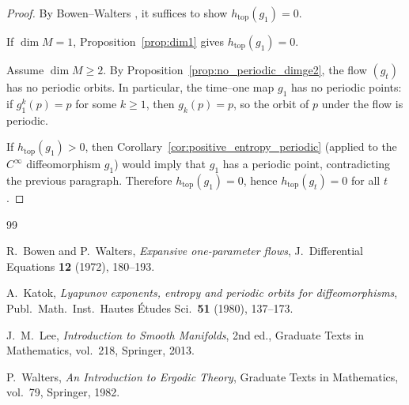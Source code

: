 \documentclass[11pt]{article}
\theoremstyle{definition}
\theoremstyle{remark}
\newcommand{\htop}{h_{\mathrm{top}}}
\begin{document}
\begin{proof}
By Bowen--Walters \cite{BW}, it suffices to show $\htop(g_1)=0$.

If $\dim M=1$, Proposition~\ref{prop:dim1} gives $\htop(g_1)=0$.

Assume $\dim M\ge 2$.
By Proposition~\ref{prop:no_periodic_dimge2}, the flow $(g_t)$ has no periodic orbits.
In particular, the time--one map $g_1$ has no periodic points: if $g_1^k(p)=p$ for some $k\ge 1$, then $g_k(p)=p$, so the orbit of $p$ under the flow is periodic.

If $\htop(g_1)>0$, then Corollary~\ref{cor:positive_entropy_periodic} (applied to the $C^\infty$ diffeomorphism $g_1$)
would imply that $g_1$ has a periodic point, contradicting the previous paragraph.
Therefore $\htop(g_1)=0$, hence $\htop(g_t)=0$ for all $t$.
\end{proof}

\begin{thebibliography}{99}

R.~Bowen and P.~Walters,
\newblock \emph{Expansive one-parameter flows},
\newblock J.\ Differential Equations \textbf{12} (1972), 180--193.

A.~Katok,
\newblock \emph{Lyapunov exponents, entropy and periodic orbits for diffeomorphisms},
\newblock Publ.\ Math.\ Inst.\ Hautes \'Etudes Sci.\ \textbf{51} (1980), 137--173.

J.~M.~Lee,
\newblock \emph{Introduction to Smooth Manifolds},
\newblock 2nd ed., Graduate Texts in Mathematics, vol.~218, Springer, 2013.

P.~Walters,
\newblock \emph{An Introduction to Ergodic Theory},
\newblock Graduate Texts in Mathematics, vol.~79, Springer, 1982.

\end{thebibliography}
\end{document}
